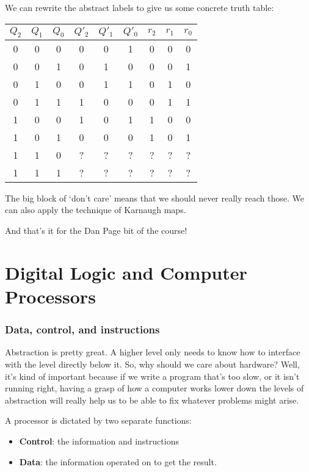 \documentclass[11pt,a4paper,titlepage,dvipsnames,cmyk]{scrartcl}
\begin{document}
We can rewrite the abstract labels to give us some concrete truth table:
\begin{center}
    \begin{tabular}{|c c c|c c c|c c c|}
        \hline
        $Q_2$ & $Q_1$ & $Q_0$ & $Q'_2$ & $Q'_1$ & $Q'_0$ & $r_2$ & $r_1$ & $r_0$ \\ \hline
        0 & 0 & 0 & 0 & 0 & 1 & 0 & 0 & 0 \\ \hline
        0 & 0 & 1 & 0 & 1 & 0 & 0 & 0 & 1 \\ \hline
        0 & 1 & 0 & 0 & 1 & 1 & 0 & 1 & 0 \\ \hline
        0 & 1 & 1 & 1 & 0 & 0 & 0 & 1 & 1 \\ \hline
        1 & 0 & 0 & 1 & 0 & 1 & 1 & 0 & 0 \\ \hline
        1 & 0 & 1 & 0 & 0 & 0 & 1 & 0 & 1 \\ \hline
        1 & 1 & 0 & ? & ? & ? & ? & ? & ? \\ \hline
        1 & 1 & 1 & ? & ? & ? & ? & ? & ? \\ \hline
    \end{tabular}
\end{center}

The big block of `don't care' means that we should never really reach
those. We can also apply the technique of Karnaugh maps.

And that's it for the Dan Page bit of the course!

\part{Digital Logic and Computer Processors}
\label{part2}

\section{Data, control, and instructions}%
\label{sec:Data}

Abstraction is pretty great. A higher level only needs to know how to
interface with the level directly below it. So, why should we care about
hardware? Well, it's kind of important because if we write a program
that's too slow, or it isn't running right, having a grasp of how a
computer works lower down the levels of abstraction will really help us
to be able to fix whatever problems might arise.

A processor is dictated by two separate functions:
\begin{itemize}
    \item \textbf{Control}: the information and instructions
    \item \textbf{Data}: the information operated on to get the result.
\end{itemize}
\end{document}
